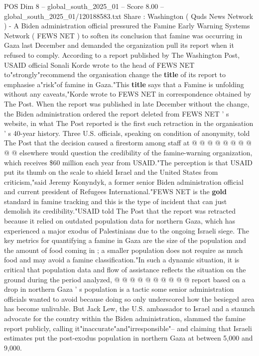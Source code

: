\begin{textsample}{POS Dim 8 – global\_south\_2025\_01 – Score 8.00 – global\_south\_2025\_01/120188583.txt}  \label{ex:f8_pos_116}
Share : Washington ( Quds News Network ) - A Biden administration official pressured the Famine Early Warning Systems Network ( FEWS NET ) to soften its conclusion that famine was occurring in Gaza last December and demanded the organization pull its report when it refused to comply.
According to a report published by The Washington Post, USAID official Sonali Korde wrote to the head of FEWS NET to"strongly"recommend the organisation change the \textbf{title} of its report to emphasise a"risk"of famine in Gaza."This \textbf{title} says that a Famine is unfolding without any caveats,"Korde wrote to FEWS NET in correspondence obtained by The Post.
When the report was published in late December without the change, the Biden administration ordered the report deleted from FEWS NET ' s website, in what The Post reported is the first such retraction in the organisation ' s 40-year history.
Three U.S. officials, speaking on condition of anonymity, told The Post that the decision caused a firestorm among staff at @ @ @ @ @ @ @ @ @ @ elsewhere would question the credibility of the famine-warning organization, which receives \$60 million each year from USAID."The perception is that USAID put its thumb on the scale to shield Israel and the United States from criticism,"said Jeremy Konyndyk, a former senior Biden administration official and current president of Refugees International."FEWS NET is the \textbf{gold} standard in famine tracking and this is the type of incident that can just demolish its credibility."USAID told The Post that the report was retracted because it relied on outdated population data for northern Gaza, which has experienced a major exodus of Palestinians due to the ongoing Israeli siege.
The key metrics for quantifying a famine in Gaza are the size of the population and the amount of food coming in ; a smaller population does not require as much food and may avoid a famine classification."In such a dynamic situation, it is critical that population data and flow of assistance reflects the situation on the ground during the period analyzed, @ @ @ @ @ @ @ @ @ @ report based on a drop in northern Gaza ' s population is a tactic some senior administration officials wanted to avoid because doing so only underscored how the besieged area has become unlivable.
But Jack Lew, the U.S. ambassador to Israel and a staunch advocate for the country within the Biden administration, slammed the famine report publicly, calling it"inaccurate"and"irresponsible"-- and claiming that Israeli estimates put the post-exodus population in northern Gaza at between 5,000 and 9,000.

\end{textsample}
